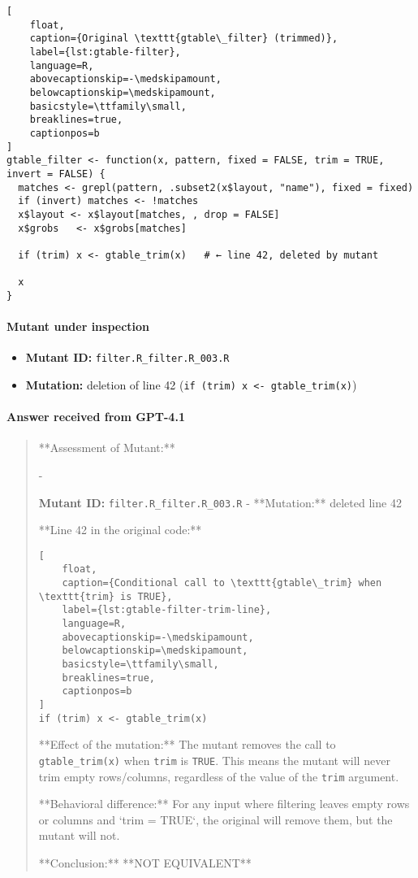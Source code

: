 \begin{lstlisting}[
    float,
    caption={Original \texttt{gtable\_filter} (trimmed)},
    label={lst:gtable-filter},
    language=R,
    abovecaptionskip=-\medskipamount,
    belowcaptionskip=\medskipamount,
    basicstyle=\ttfamily\small,
    breaklines=true,
    captionpos=b
]
gtable_filter <- function(x, pattern, fixed = FALSE, trim = TRUE, invert = FALSE) {
  matches <- grepl(pattern, .subset2(x$layout, "name"), fixed = fixed)
  if (invert) matches <- !matches
  x$layout <- x$layout[matches, , drop = FALSE]
  x$grobs   <- x$grobs[matches]

  if (trim) x <- gtable_trim(x)   # ← line 42, deleted by mutant

  x
}
\end{lstlisting}


\paragraph{Mutant under inspection}
\begin{itemize}
  \item \textbf{Mutant ID:} \texttt{filter.R\_filter.R\_003.R}
  \item \textbf{Mutation:} deletion of line 42 (\texttt{if (trim) x <- gtable\_trim(x)})
\end{itemize}

\paragraph{Answer received from GPT-4.1}
\begin{quote}
**Assessment of Mutant:**

-   \item \textbf{Mutant ID:} \texttt{filter.R\_filter.R\_003.R}  
- **Mutation:** deleted line 42

**Line 42 in the original code:**
\begin{lstlisting}[
    float,
    caption={Conditional call to \texttt{gtable\_trim} when \texttt{trim} is TRUE},
    label={lst:gtable-filter-trim-line},
    language=R,
    abovecaptionskip=-\medskipamount,
    belowcaptionskip=\medskipamount,
    basicstyle=\ttfamily\small,
    breaklines=true,
    captionpos=b
]
if (trim) x <- gtable_trim(x)
\end{lstlisting}


**Effect of the mutation:**  
The mutant removes the call to \texttt{gtable\_trim(x)} when \texttt{trim} is \texttt{TRUE}. This means the mutant will never trim empty rows/columns, regardless of the value of the \texttt{trim} argument.

**Behavioral difference:**  
For any input where filtering leaves empty rows or columns and `trim = TRUE`, the original will remove them, but the mutant will not.

**Conclusion:**  
**NOT EQUIVALENT**
\end{quote}

